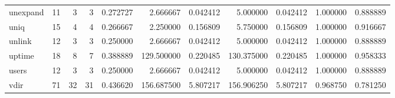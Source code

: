 \begin{tabular}{lrrrrrrrrrr}
unexpand  &                                      11 &                  3 &                                 3 &                                   0.272727 &                               2.666667 &                                     0.042412 &                          5.000000 &                                0.042412 &                           1.000000 &                                           0.888889 \\
uniq      &                                      15 &                  4 &                                 4 &                                   0.266667 &                               2.250000 &                                     0.156809 &                          5.750000 &                                0.156809 &                           1.000000 &                                           0.916667 \\
unlink    &                                      12 &                  3 &                                 3 &                                   0.250000 &                               2.666667 &                                     0.042412 &                          5.000000 &                                0.042412 &                           1.000000 &                                           0.888889 \\
uptime    &                                      18 &                  8 &                                 7 &                                   0.388889 &                             129.500000 &                                     0.220485 &                        130.375000 &                                0.220485 &                           1.000000 &                                           0.958333 \\
users     &                                      12 &                  3 &                                 3 &                                   0.250000 &                               2.666667 &                                     0.042412 &                          5.000000 &                                0.042412 &                           1.000000 &                                           0.888889 \\
vdir      &                                      71 &                 32 &                                31 &                                   0.436620 &                             156.687500 &                                     5.807217 &                        156.906250 &                                5.807217 &                           0.968750 &                                           0.781250 \\

\end{tabular}
